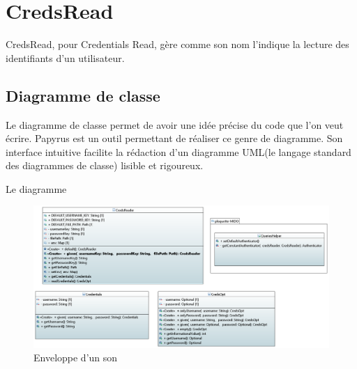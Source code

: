 \chapter[CredsRead]{CredsRead\raisebox{.3\baselineskip}{\normalsize\footnotemark}}

CredsRead, pour Credentials Read, gère comme son nom l'indique la lecture des identifiants d'un utilisateur.

\section{Diagramme de classe}
Le diagramme de classe permet de avoir une idée précise du code que l'on veut écrire. Papyrus est un outil permettant de réaliser ce genre de diagramme. Son interface intuitive facilite la rédaction d'un diagramme UML(le langage standard des diagrammes de classe) lisible et rigoureux. 

Le diagramme 

\begin{figure}[!h]
    \begin{center}
    \includegraphics[width=18cm]{assets/doc.png}
    \end{center}
    \caption{Enveloppe d'un son}
\end{figure}